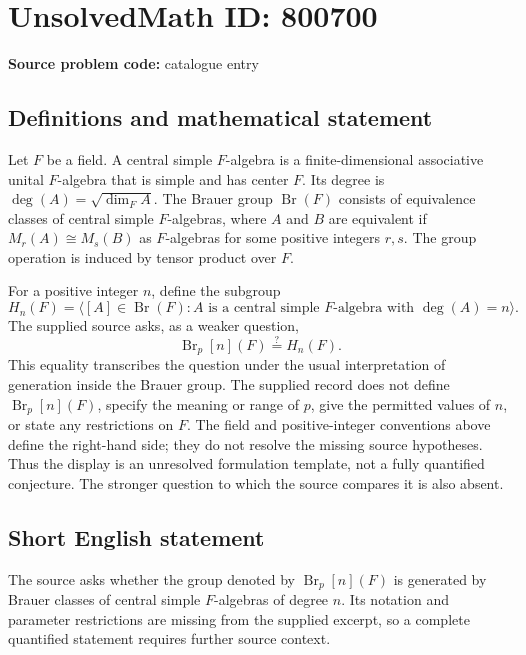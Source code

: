 \documentclass[11pt]{article}
\begin{document}
\section*{UnsolvedMath ID: 800700}
\textbf{Source problem code:} catalogue entry
\subsection{Definitions and mathematical statement}
Let \(F\) be a field. A central simple \(F\)-algebra is a finite-dimensional associative unital \(F\)-algebra that is simple and has center \(F\). Its degree is \(\deg(A)=\sqrt{\dim_F A}\). The Brauer group \(\operatorname{Br}(F)\) consists of equivalence classes of central simple \(F\)-algebras, where \(A\) and \(B\) are equivalent if \(M_r(A)\cong M_s(B)\) as \(F\)-algebras for some positive integers \(r,s\). The group operation is induced by tensor product over \(F\).

For a positive integer \(n\), define the subgroup
\[
H_n(F)=\bigl\langle [A]\in\operatorname{Br}(F): A\text{ is a central simple }F\text{-algebra with }\deg(A)=n\bigr\rangle.
\]
The supplied source asks, as a weaker question,
\[
\operatorname{Br}_p[n](F)\stackrel{?}{=}H_n(F).
\]
This equality transcribes the question under the usual interpretation of generation inside the Brauer group. The supplied record does not define \(\operatorname{Br}_p[n](F)\), specify the meaning or range of \(p\), give the permitted values of \(n\), or state any restrictions on \(F\). The field and positive-integer conventions above define the right-hand side; they do not resolve the missing source hypotheses. Thus the display is an unresolved formulation template, not a fully quantified conjecture. The stronger question to which the source compares it is also absent.
\subsection{Short English statement}
The source asks whether the group denoted by \(\operatorname{Br}_p[n](F)\) is generated by Brauer classes of central simple \(F\)-algebras of degree \(n\). Its notation and parameter restrictions are missing from the supplied excerpt, so a complete quantified statement requires further source context.
\end{document}
